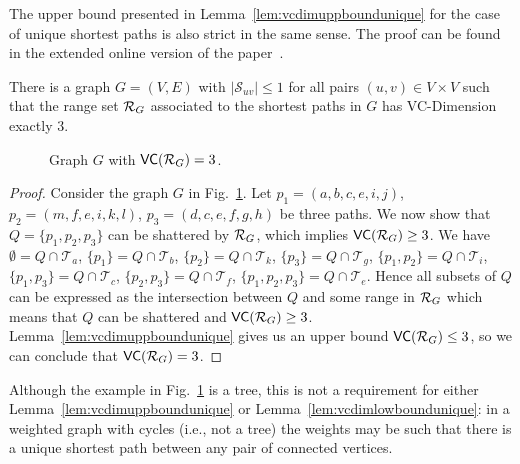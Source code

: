 The upper bound presented in Lemma~\ref{lem:vcdimuppboundunique}  for the case
of unique shortest paths is also strict in the same sense.
\ifproof
\else
The proof can be found in the extended online version of the
paper~\citep{RiondatoK13}.
\fi

\begin{lemma}\label{lem:vcdimlowboundunique}
  There is a graph $G=(V,E)$ with $|\mathcal{S}_{uv}|\le1$ for all
  pairs $(u,v)\in V\times V$ such that the range set $\mathcal{R}_G$ associated to the
  shortest paths in $G$ has VC-Dimension exactly $3$.
\end{lemma}

\ifproof
\begin{figure}[ht]
  \centering
  \caption{Graph $G$ with $\mathsf{VC}(\mathcal{R}_G)= 3$.}
  \label{fig:uniquetight}
\end{figure}

\begin{proof}
  Consider the graph $G$ in Fig.~\ref{fig:uniquetight}.
  Let $p_1=(a,b,c,e,i,j)$, $p_2=(m,f,e,i,k,l)$, $p_3=(d,c,e,f,g,h)$ be three
  paths. We now show that $Q=\{p_1,p_2,p_3\}$ can be shattered by $\mathcal{R}_G$, which
  implies $\mathsf{VC}(\mathcal{R}_G)\ge 3$. We have $\emptyset=Q\cap\mathcal{T}_a$,
  $\{p_1\}=Q\cap\mathcal{T}_b$, $\{p_2\}=Q\cap\mathcal{T}_k$,
  $\{p_3\}=Q\cap\mathcal{T}_g$, $\{p_1,p_2\}=Q\cap\mathcal{T}_i$,
  $\{p_1,p_3\}=Q\cap\mathcal{T}_c$, $\{p_2,p_3\}=Q\cap\mathcal{T}_f$,
  $\{p_1,p_2,p_3\}=Q\cap\mathcal{T}_e$.  
  Hence all subsets of $Q$ can be expressed as the intersection between $Q$ and
  some range in $\mathcal{R}_G$ which means that $Q$ can be shattered and
  $\mathsf{VC}(\mathcal{R}_G)\ge 3$. Lemma~\ref{lem:vcdimuppboundunique} gives us an upper
  bound $\mathsf{VC}(\mathcal{R}_G)\le3$, so we can conclude that $\mathsf{VC}(\mathcal{R}_G)=3$.
\end{proof}

Although the example in Fig.~\ref{fig:uniquetight} is a tree, this is not a
requirement for either Lemma~\ref{lem:vcdimuppboundunique} or
Lemma~\ref{lem:vcdimlowboundunique}: in a weighted graph with cycles (i.e., not
a tree) the weights may be such that there is a unique shortest path between any
pair of connected vertices.
\fi

